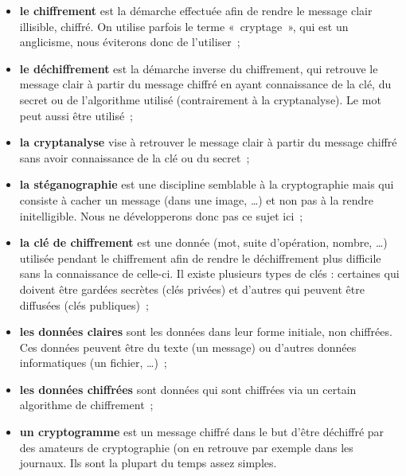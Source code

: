 \begin{itemize}

\item {\sffamily\textbf{le chiffrement}} est la démarche effectuée afin de rendre
  le message clair illisible, chiffré. On utilise parfois le terme
  «~cryptage~», qui est un anglicisme, nous éviterons donc de
  l'utiliser~;

\item {\sffamily\textbf{le déchiffrement}} est la démarche inverse du chiffrement, qui retrouve
  le message clair à partir du message chiffré en ayant connaissance
  de la clé, du secret ou de l'algorithme utilisé (contrairement à la
  cryptanalyse). Le mot {} peut aussi
être utilisé~;
\item {\sffamily\textbf{la cryptanalyse}} vise à retrouver le
message clair à partir du message chiffré sans avoir connaissance
de la clé ou du secret~;

\item {\sffamily\textbf{la stéganographie}} est une discipline semblable à la
  cryptographie mais qui consiste à cacher un message (dans une
  image, \dots) et non pas à la rendre initelligible. Nous ne
développerons donc pas ce sujet ici~;

\item {\sffamily\textbf{la clé de chiffrement}} est une donnée (mot, suite d'opération,
  nombre, \dots) utilisée pendant le chiffrement afin de rendre le
  déchiffrement plus difficile sans la connaissance de celle-ci. Il
  existe plusieurs types de clés : certaines qui doivent être gardées
  secrètes (clés privées) et d'autres qui peuvent être diffusées
  (clés publiques)~;

\item {\sffamily\textbf{les données claires}} sont les données dans leur forme initiale, non
  chiffrées. Ces données peuvent être du texte (un message) ou d'autres
  données informatiques (un fichier, \dots)~;

\item {\sffamily\textbf{les données chiffrées}} sont données qui
sont chiffrées via un certain
  algorithme de chiffrement~;

\item {\sffamily\textbf{un cryptogramme}} est un message chiffré
dans le but d'être déchiffré par des amateurs de cryptographie (on
en retrouve par exemple dans les journaux. Ils sont la plupart du
temps assez simples.

\end{itemize}
